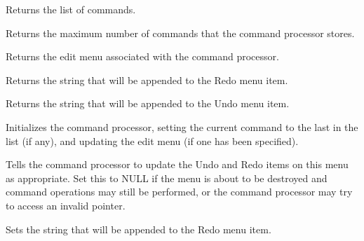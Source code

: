 
Returns the list of commands.



Returns the maximum number of commands that the command processor stores.



Returns the edit menu associated with the command processor.

\label{wxcommandprocessorgetredoaccelerator}


Returns the string that will be appended to the Redo menu item.

\label{wxcommandprocessorgetundoaccelerator}


Returns the string that will be appended to the Undo menu item.



Initializes the command processor, setting the current command to the
last in the list (if any), and updating the edit menu (if one has been
specified).



Tells the command processor to update the Undo and Redo items on this
menu as appropriate. Set this to NULL if the menu is about to be
destroyed and command operations may still be performed, or the command
processor may try to access an invalid pointer.

\label{wxcommandprocessorsetredoaccelerator}


Sets the string that will be appended to the Redo menu item.

\label{wxcommandprocessorsetundoaccelerator}

